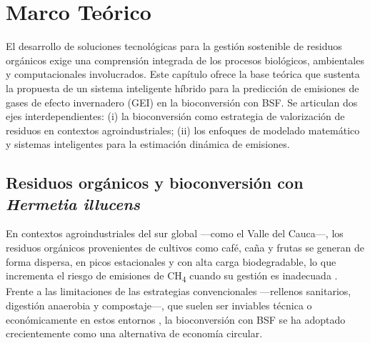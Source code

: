 \chapter{Marco Teórico}

El desarrollo de soluciones tecnológicas para la gestión sostenible de residuos orgánicos exige una comprensión integrada de los procesos biológicos, ambientales y computacionales involucrados. Este capítulo ofrece la base teórica que sustenta la propuesta de un sistema inteligente híbrido para la predicción de emisiones de gases de efecto invernadero (GEI) en la bioconversión con BSF. Se articulan dos ejes interdependientes: (i) la bioconversión como estrategia de valorización de residuos en contextos agroindustriales; (ii) los enfoques de modelado matemático y sistemas inteligentes para la estimación dinámica de emisiones.

\section{Residuos orgánicos y bioconversión con \textit{Hermetia illucens}}

En contextos agroindustriales del sur global —como el Valle del Cauca—, los residuos orgánicos provenientes de cultivos como café, caña y frutas se generan de forma dispersa, en picos estacionales y con alta carga biodegradable, lo que incrementa el riesgo de emisiones de CH\textsubscript{4} cuando su gestión es inadecuada \parencite{lacknerAgriculturalWasteChallenges2025,leddinImpactClimateChange2024a}. Frente a las limitaciones de las estrategias convencionales —rellenos sanitarios, digestión anaerobia y compostaje—, que suelen ser inviables técnica o económicamente en estos entornos \parencite{kongEvaluatingGreenhouseGas2012,nordahlGreenhouseGasAir2023a}, la bioconversión con BSF se ha adoptado crecientemente como una alternativa de economía circular.

